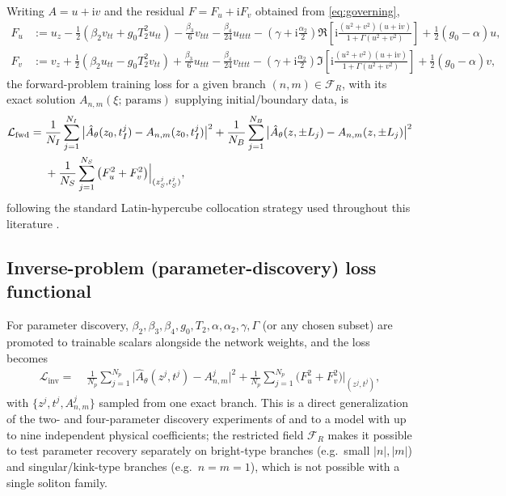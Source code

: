 \documentclass[11pt]{article}
\newcommand{\ii}{\mathrm{i}}
\begin{document}
Writing $A=u+\ii v$ and the residual $F=F_u+\ii F_v$ obtained from
\eqref{eq:governing},
\begin{align}
F_u&:=u_z-\tfrac12\!\left(\beta_2 v_{tt}+g_0T_2^2u_{tt}\right)-\tfrac{\beta_3}{6}v_{ttt}-\tfrac{\beta_4}{24}u_{tttt}
-\left(\gamma+\ii\tfrac{\alpha_2}{2}\right)\!\Re\!\left[\ii\frac{(u^2+v^2)(u+\ii v)}{1+\Gamma(u^2+v^2)}\right]
+\tfrac12(g_0-\alpha)u, \\
F_v&:=v_z+\tfrac12\!\left(\beta_2 u_{tt}-g_0T_2^2v_{tt}\right)+\tfrac{\beta_3}{6}u_{ttt}-\tfrac{\beta_4}{24}v_{tttt}
-\left(\gamma+\ii\tfrac{\alpha_2}{2}\right)\!\Im\!\left[\ii\frac{(u^2+v^2)(u+\ii v)}{1+\Gamma(u^2+v^2)}\right]
+\tfrac12(g_0-\alpha)v,
\end{align}
the forward-problem training loss for a given branch $(n,m)\in\mathcal{F}_R$, with its
exact solution $A_{n,m}(\xi;\,\text{params})$ supplying initial/boundary data, is
\begin{align}
\mathcal{L}_{\text{fwd}}=\;&\frac{1}{N_I}\sum_{j=1}^{N_I}\big|\hat A_\theta(z_0,t_I^j)-A_{n,m}(z_0,t_I^j)\big|^2
+\frac{1}{N_B}\sum_{j=1}^{N_B}\big|\hat A_\theta(z,\pm L_j)-A_{n,m}(z,\pm L_j)\big|^2 \notag\\
&+\frac{1}{N_S}\sum_{j=1}^{N_S}\big(F_u^{2}+F_v^{2}\big)\Big|_{(z^j_S,t^j_S)},
\end{align}
following the standard Latin-hypercube collocation strategy used throughout this
literature \citep{raissi2019,zhou2021,fang2021}.

\subsection{Inverse-problem (parameter-discovery) loss functional}

For parameter discovery, $\beta_2,\beta_3,\beta_4,g_0,T_2,\alpha,\alpha_2,\gamma,\Gamma$
(or any chosen subset) are promoted to trainable scalars alongside the network weights,
and the loss becomes
\begin{align}
\mathcal{L}_{\text{inv}}=\;&\frac{1}{N_p}\sum_{j=1}^{N_p}\big|\hat A_\theta(z^j,t^j)-A_{n,m}^j\big|^2
+\frac{1}{N_p}\sum_{j=1}^{N_p}\big(F_u^2+F_v^2\big)\Big|_{(z^j,t^j)},
\end{align}
with $\{z^j,t^j,A_{n,m}^j\}$ sampled from one exact branch. This is a direct
generalization of the two- and four-parameter discovery experiments of
\citet{zhou2021} and \citet{fang2021} to a model with up to nine independent physical
coefficients; the restricted field $\mathcal{F}_R$ makes it possible to test parameter
recovery separately on bright-type branches (e.g.\ small $|n|,|m|$) and singular/kink-type
branches (e.g.\ $n=m=1$), which is not possible with a single soliton family.
\end{document}
